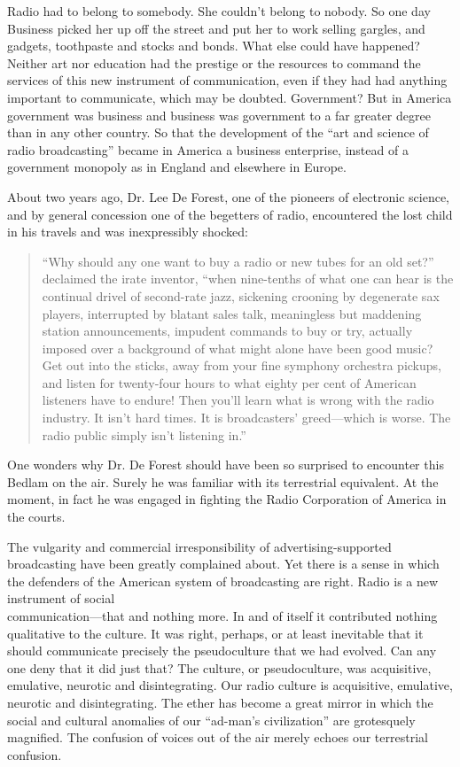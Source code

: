 \documentclass[twoside,nohyper,openany,nobib]{tufte-book}
\begin{document}
Radio had to belong to somebody. She couldn't belong to nobody. So one
day Business picked her up off the street and put her to work selling
gargles, and gadgets, toothpaste and stocks and bonds. What else could
have happened? Neither art nor education had the prestige or the
resources to command the services of this new instrument of
communication, even if they had had anything important to communicate,
which may be doubted. Government? But in America government was business
and business was government to a far greater degree than in any other
country. So that the development of the ``art and science of radio
broadcasting'' became in America a business enterprise, instead of a
government monopoly as in England and elsewhere in Europe.

About two years ago, Dr. Lee De Forest, one of the pioneers of
electronic science, and by general concession one of the begetters of
radio, encountered the lost child in his travels and was inexpressibly
shocked:

\begin{quote}
``Why should any one want to buy a radio or new tubes for an old set?''
declaimed the irate inventor, ``when nine-tenths of what one can hear is
the continual drivel of second-rate jazz, sickening crooning by
degenerate sax players, interrupted by blatant sales talk, meaningless
but maddening station announcements, impudent commands to buy or try,
actually imposed over a background of what might alone have been good
music? Get out into the sticks, away from your fine symphony orchestra
pickups, and listen for twenty-four hours to what eighty per cent of
American listeners have to endure! Then you'll learn what is wrong with
the radio industry. It isn't hard times. It is broadcasters'
greed---which is worse. The radio public simply isn't listening in.''
\end{quote}

One wonders why Dr. De Forest should have been so surprised to encounter
this Bedlam on the air. Surely he was familiar with its terrestrial
equivalent. At the moment, in fact he was engaged in fighting the Radio
Corporation of America in the courts.

The vulgarity and commercial irresponsibility of advertising-supported
broadcasting have been greatly complained about. Yet there is a sense in
which the defenders of the American system of broadcasting are right.
Radio is a new instrument of social\\ \noindent communication---that and nothing
more. In and of itself it contributed nothing qualitative to the
culture. It was right, perhaps, or at least inevitable that it should
communicate precisely the pseudoculture that we had evolved. Can any one
deny that it did just that? The culture, or pseudoculture, was
acquisitive, emulative, neurotic and disintegrating. Our radio culture
is acquisitive, emulative, neurotic and disintegrating. The ether has
become a great mirror in which the social and cultural anomalies of our
``ad-man's civilization'' are grotesquely magnified. The confusion of
voices out of the air merely echoes our terrestrial confusion.
\end{document}
